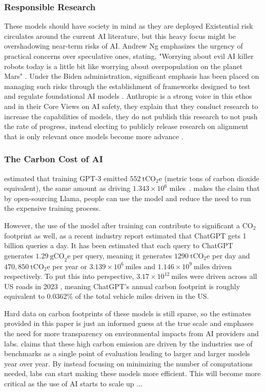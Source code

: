 \subsubsection{Responsible Research}
These models should have society in mind as they are deployed
Existential risk circulates around the current AI literature, but this heavy focus might be overshadowing near-term risks of AI. Andrew Ng emphasizes the urgency of practical concerns over speculative ones, stating, "Worrying about evil AI killer robots today is a little bit like worrying about overpopulation on the planet Mars" \citep{ng_andrew_2017}. Under the Biden administration, significant emphasis has been placed on managing such risks through the establishment of frameworks designed to test and regulate foundational AI models \citep{the_white_house_fact_2023}. Anthropic is a strong voice in this ethos and in their Core Views on AI safety, they explain that they conduct research to increase the capabilities of models, they do not publish this research to not push the rate of progress, instead electing to publicly release research on alignment that is only relevant once models become more advance \citep{anthropic_core_2023}.


\subsubsection{The Carbon Cost of AI}
\cite{patterson_2021_carbon} estimated that training GPT-3 emitted $552~\text{tCO}_{2}\text{e}$ (metric tons of carbon dioxide equivalent), the same amount as driving $1.343 \times 10^{6}$ miles~\citep{epa_2014_vehicle}. \cite{touvron_llama_2023} makes the claim that by open-sourcing Llama, people can use the model and reduce the need to run the expensive training process. 

However, the use of the model after training can contribute to significant a $\text{CO}_{2}$ footprint as well, as a recent industry report \citep{singh_chatgpt_2025} estimated that ChatGPT gets 1 billion queries a day. It has been estimated that each query to ChatGPT generates $1.29~\text{gCO}_{2}\text{e}$ per query, meaning it generates $1290~\text{tCO}_{2}\text{e}$ per day and $470,850~\text{tCO}_{2}\text{e}$ per year or $3.139 \times 10^{6}~\text{miles}$ and $1.146 \times 10^{9}~\text{miles}$ driven respectively. To put this into perspective, $3.17 \times 10^{12}~\text{miles}$ were driven across all US roads in 2023 \citep{statista_2023_vmt}, meaning ChatGPT's annual carbon footprint is roughly equivalent to 0.0362\% of the total vehicle miles driven in the US.

Hard data on carbon footprints of these models is still sparse, so the estimates provided in this paper is just an informed guess at the true scale and emphases the need for more transparency on environmental impacts from AI providers and labs. \cite{schwartz_green_2019} claims that these high carbon emission are driven by the industries use of benchmarks as a single point of evaluation leading to larger and larger models year over year. By instead focusing on minimizing the number of computations needed, labs can start making these models more efficient. This will become more critical as the use of AI starts to scale up ...